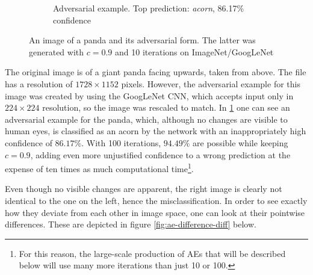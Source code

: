 \documentclass[11pt, a4paper]{article}
\begin{document}
\begin{figure}[htb]
\begin{subfigure}[b]{0.45\textwidth}
        \caption{Adversarial example. Top prediction: \emph{acorn}, 86.17\% confidence \\}
        \label{fig:ae-example-ae}
    \end{subfigure}
    \caption{An image of a panda and its adversarial form. The latter was generated with $c = 0.9$ and 10 iterations on ImageNet/GoogLeNet}
    \label{fig:ae-example}
\end{figure}

The original image is of a giant panda facing upwards, taken from above. The file has a resolution of $1728 \times 1152$ pixels. However, the adversarial example for this image was created by using the GoogLeNet CNN, which accepts input only in $224 \times 224$ resolution, so the image was rescaled to match. In \ref{fig:ae-example-ae} one can see an adversarial example for the panda, which, although no changes are visible to human eyes, is classified as an acorn by the network with an inappropriately high confidence of $86.17\%$. With 100 iterations, $94.49\%$ are possible while keeping $c = 0.9$, adding even more unjustified confidence to a wrong prediction at the expense of ten times as much computational time\footnote{For this reason, the large-scale production of AEs that will be described below will use many more iterations than just 10 or 100.}.

Even though no visible changes are apparent, the right image is clearly not identical to the one on the left, hence the misclassification. In order to see exactly how they deviate from each other in image space, one can look at their pointwise differences. These are depicted in figure \ref{fig:ae-difference-diff} below.
\end{document}
